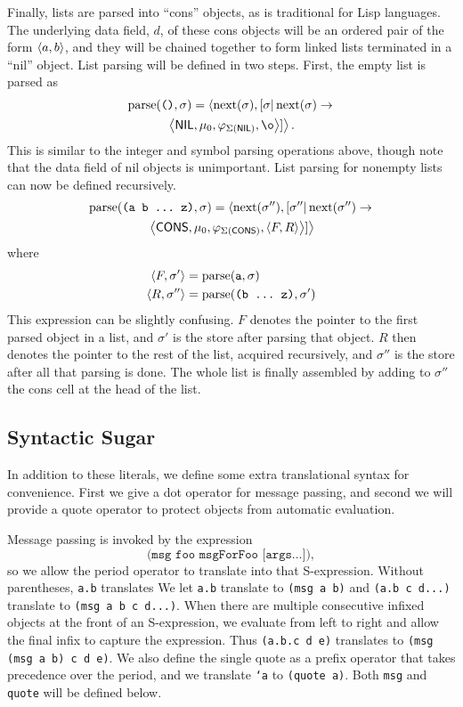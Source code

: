 \documentclass[twocolumn]{article}
\begin{document}
Finally, lists are parsed into ``cons'' objects, as is traditional for
Lisp languages. The underlying data field, $d$, of these cons objects
will be an ordered pair of the form $\left< a,b\right>$, and they will be
chained together to form linked lists terminated in a ``nil''
object. List parsing will be defined in two steps. First, the empty
list is parsed as
\begin{multline*}
  \parse(\texttt{()},\sigma) = \lb\next(\sigma),
  [\sigma|\operatorname{next}(\sigma) \rightarrow \right.\\
\left.\lb\mathsf{NIL}, \mu_0, \varphi_{\Sigma(\mathsf{NIL})}, \o\rb]\rb.
\end{multline*}
This is similar to the integer and symbol parsing operations above,
though note that the data field of nil objects is unimportant. List
parsing for nonempty lists can now be defined recursively.
\begin{multline*} \operatorname{parse}(\texttt{(a b \ldots\ z)},\sigma) = \left<
  \operatorname{next}(\sigma''),[\sigma''|\operatorname{next}(\sigma'')
  \rightarrow\right. \\\left.\left<\mathsf{CONS}, \mu_0,
  \varphi_{\Sigma(\mathsf{CONS})},
  \left< F, R \right> \right> ] \right>
\end{multline*}
where
\begin{align*}
  \left< F, \sigma' \right> &= \operatorname{parse}( \texttt{a}, \sigma ) \\
  \left< R, \sigma'' \right> &= \operatorname{parse}( \texttt{(b \ldots\ z)}, \sigma')
\end{align*}
This expression can be slightly confusing. $F$ denotes the pointer to
the first parsed object in a list, and $\sigma'$ is the store after
parsing that object. $R$ then denotes the pointer to the rest of the
list, acquired recursively, and $\sigma''$ is the store after all that
parsing is done. The whole list is finally assembled by adding to
$\sigma''$ the cons cell at the head of the list.

\subsection*{Syntactic Sugar}
In addition to these literals, we define some extra translational
syntax for convenience. First we give a dot operator for message
passing, and second we will provide a quote operator to protect
objects from automatic evaluation.

Message passing is invoked by the expression
\[\texttt{(msg foo msgForFoo [args...])},\]
so we allow the period operator to translate into that
S-expression. Without parentheses, \texttt{a.b} translates We let \texttt{a.b} translate to \texttt{(msg a b)} and
\texttt{(a.b c d...)} translate to \texttt{(msg a b c d...)}. When
there are multiple consecutive infixed objects at the front of an
S-expression, we evaluate from left to right and allow the final infix
to capture the expression. Thus \texttt{(a.b.c d e)} translates to
\texttt{(msg (msg a b) c d e)}. We also define the single quote as a
prefix operator that takes precedence over the period, and we
translate \texttt{`a} to \texttt{(quote a)}. Both \texttt{msg} and
\texttt{quote} will be defined below.
\end{document}
